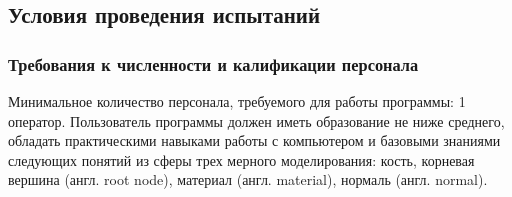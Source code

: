 \subsection{Условия проведения испытаний}

\subsubsection{Требования к численности и калификации персонала}
Минимальное количество персонала, требуемого для работы программы: 1 оператор. Пользователь программы должен иметь образование не ниже среднего, обладать практическими навыками работы с компьютером и базовыми знаниями следующих понятий из сферы трех мерного моделирования: кость, корневая вершина (англ. root node), материал (англ. material), нормаль (англ. normal).




